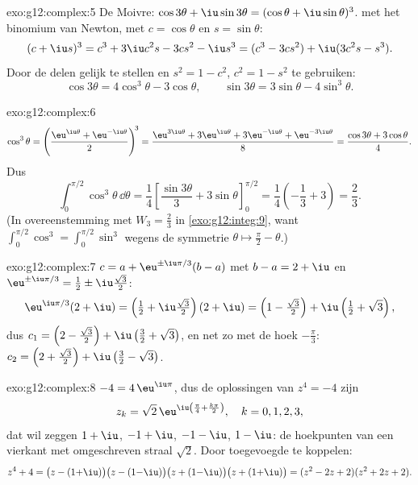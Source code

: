 \begin{solution}{exo:g12:complex:5}
De Moivre: $\cos3\theta + \iu\sin3\theta = (\cos\theta + \iu\sin\theta)^3$.
 met het binomium van Newton, met $c = \cos\theta$ en
$s = \sin\theta$:
\[
(c + \iu s)^3 = c^3 + 3\iu c^2 s - 3 c s^2 - \iu s^3
= (c^3 - 3cs^2) + \iu(3c^2 s - s^3).
\]
Door de delen gelijk te stellen en $s^2 = 1 - c^2$, $c^2 = 1 - s^2$ te
gebruiken:
\[
\cos3\theta = 4\cos^3\theta - 3\cos\theta,
\qquad
\sin3\theta = 3\sin\theta - 4\sin^3\theta .
\]
\end{solution}

\begin{solution}{exo:g12:complex:6}
\[
\cos^3\theta = \left(\frac{\eu^{\iu\theta} + \eu^{-\iu\theta}}{2}\right)^{\!3}
= \frac{\eu^{3\iu\theta} + 3\eu^{\iu\theta} + 3\eu^{-\iu\theta} + \eu^{-3\iu\theta}}{8}
= \frac{\cos3\theta + 3\cos\theta}{4}.
\]
Dus
\[
\int_0^{\pi/2}\cos^3\theta\,\dd\theta
= \frac14\left[\frac{\sin3\theta}{3} + 3\sin\theta\right]_0^{\pi/2}
= \frac14\left(-\frac13 + 3\right) = \frac{2}{3}.
\]
(In overeenstemming met $W_3 = \frac23$ in \cref{exo:g12:integ:9}, want
$\int_0^{\pi/2}\cos^3 = \int_0^{\pi/2}\sin^3$ wegens de symmetrie
$\theta \mapsto \frac\pi2 - \theta$.)
\end{solution}

\begin{solution}{exo:g12:complex:7}
$c = a + \eu^{\pm\iu\pi/3}(b - a)$ met $b - a = 2 + \iu$ en
$\eu^{\pm\iu\pi/3} = \frac12 \pm \iu\frac{\sqrt3}{2}$:
\[
\eu^{\iu\pi/3}(2+\iu) = \left(\tfrac12 + \iu\tfrac{\sqrt3}{2}\right)(2+\iu)
= \left(1 - \tfrac{\sqrt3}{2}\right) + \iu\left(\tfrac12 + \sqrt3\right),
\]
dus $c_1 = \left(2 - \frac{\sqrt3}{2}\right) +
\iu\left(\frac32 + \sqrt3\right)$, en net zo met de hoek $-\frac\pi3$:
$c_2 = \left(2 + \frac{\sqrt3}{2}\right) + \iu\left(\frac32 - \sqrt3\right)$.
\end{solution}

\begin{solution}{exo:g12:complex:8}
$-4 = 4\,\eu^{\iu\pi}$, dus de oplossingen van $z^4 = -4$ zijn
\[
z_k = \sqrt2\,\eu^{\iu\left(\frac\pi4 + \frac{k\pi}{2}\right)},
\quad k = 0, 1, 2, 3,
\]
dat wil zeggen $1 + \iu$, $-1 + \iu$, $-1 - \iu$, $1 - \iu$: de hoekpunten van
een vierkant met omgeschreven straal $\sqrt 2$. Door toegevoegde  te
koppelen:
\[
z^4 + 4 = \bigl(z - (1{+}\iu)\bigr)\bigl(z - (1{-}\iu)\bigr)
\bigl(z + (1{-}\iu)\bigr)\bigl(z + (1{+}\iu)\bigr)
= (z^2 - 2z + 2)(z^2 + 2z + 2).
\]
\end{solution}

